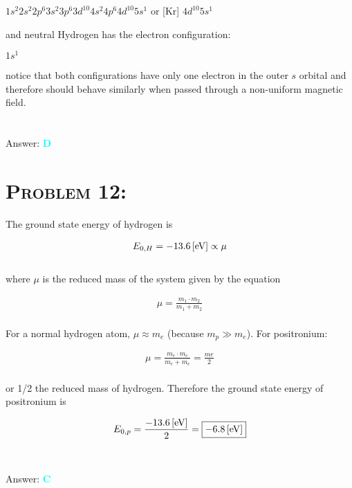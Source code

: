 \documentclass{article}
\begin{document}
\begin{center}
$1s^{2} 2s^{2} 2p^{6} 3s^{2} 3p^{6} 3d^{10} 4s^{2} 4p^{6} 4d^{10} 5s^{1}$ \hspace{.01in} or \hspace{.01in}  [Kr]  $4d^{10} 5s^1$
\end{center}
and neutral Hydrogen has the electron configuration:

\begin{center}
$1s^{1}$
\end{center}
notice that both configurations have only one electron in the outer $s$ orbital and therefore should behave similarly when passed through a non-uniform magnetic field.\\
\\\\
Answer: \textbf{\textcolor{cyan}D}\\


\section{\textsc{Problem 12:}} The ground state energy of hydrogen is 

\begin{gather}
E_{0,H} = -\unit[13.6]{[eV]} \propto \mu
\end{gather}
\\
where $\mu$ is the reduced mass of the system given by the equation

\begin{gather}
\mu = \frac{m_{1} \cdot m_{2}}{m_{1} + m_{2}}
\end{gather}
\\
For a normal hydrogen atom, $\mu \approx m_{e}$ (because $m_{p} \gg m_{e}$). For positronium: 

\begin{gather}
\mu = \frac{m_{e} \cdot m_{e}}{m_{e} + m_{e}} = \frac{me}{2}\nonumber
\end{gather}
\\
or 1/2 the reduced mass of hydrogen. Therefore the ground state energy of positronium is 

\begin{gather}
E_{0,p} =\frac{-\unit[13.6]{[eV]}}{2} =\boxed{- \unit[6.8]{[eV]}}\nonumber
\end{gather}
\\\\
Answer: \textbf{\textcolor{cyan}C}\\
\end{document}
